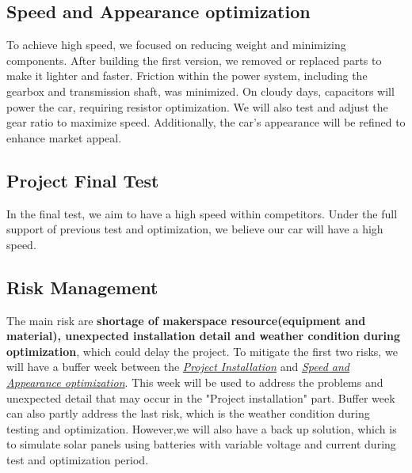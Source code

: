 \documentclass[12pt]{article}
\begin{document}
\subsection{Speed and Appearance optimization}
\label{sec:Optimization}  
To achieve high speed, we focused on reducing weight and minimizing components. After building the first version, we removed or replaced parts to make it lighter and faster. 
Friction within the power system, including the gearbox and transmission shaft, was minimized. 
On cloudy days, capacitors will power the car, requiring resistor optimization. 
We will also test and adjust the gear ratio to maximize speed. Additionally, the car's appearance will be refined to enhance market appeal.

\subsection{Project Final Test}
In the final test, we aim to have a high speed within competitors. Under the full support of previous test and optimization, we believe our car will have a high speed.
\subsection{Risk Management}
The main risk are \textbf{shortage of makerspace resource(equipment and material), unexpected installation detail and weather condition during optimization}, which could delay the project.
To mitigate the first two risks, we will have a buffer week between the \textit{\hyperref[sec:installation]{Project Installation}} and \textit{\hyperref[sec:Optimization]{Speed and Appearance optimization}}. 
This week will be used to address the problems and unexpected detail that may occur in the "Project installation" part. Buffer week can also partly address the last risk, which is the weather condition during testing and optimization.
However,we will also have a back up solution, which is to simulate solar panels using batteries with variable voltage and current during test and optimization period.
\end{document}
